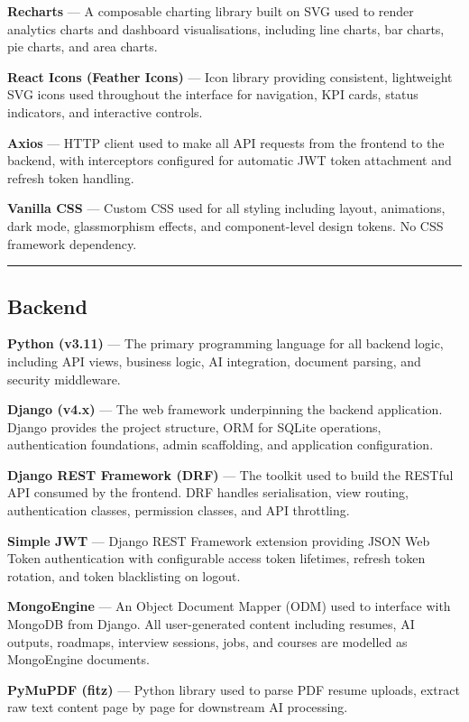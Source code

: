 \documentclass[12pt]{article}
\begin{document}
\textbf{Recharts} --- A composable charting library built on SVG used to render analytics charts and dashboard visualisations, including line charts, bar charts, pie charts, and area charts.

\textbf{React Icons (Feather Icons)} --- Icon library providing consistent, lightweight SVG icons used throughout the interface for navigation, KPI cards, status indicators, and interactive controls.

\textbf{Axios} --- HTTP client used to make all API requests from the frontend to the backend, with interceptors configured for automatic JWT token attachment and refresh token handling.

\textbf{Vanilla CSS} --- Custom CSS used for all styling including layout, animations, dark mode, glassmorphism effects, and component-level design tokens. No CSS framework dependency.

\noindent\rule{\textwidth}{0.4pt}

\subsection{Backend}

\textbf{Python (v3.11)} --- The primary programming language for all backend logic, including API views, business logic, AI integration, document parsing, and security middleware.

\textbf{Django (v4.x)} --- The web framework underpinning the backend application. Django provides the project structure, ORM for SQLite operations, authentication foundations, admin scaffolding, and application configuration.

\textbf{Django REST Framework (DRF)} --- The toolkit used to build the RESTful API consumed by the frontend. DRF handles serialisation, view routing, authentication classes, permission classes, and API throttling.

\textbf{Simple JWT} --- Django REST Framework extension providing JSON Web Token authentication with configurable access token lifetimes, refresh token rotation, and token blacklisting on logout.

\textbf{MongoEngine} --- An Object Document Mapper (ODM) used to interface with MongoDB from Django. All user-generated content including resumes, AI outputs, roadmaps, interview sessions, jobs, and courses are modelled as MongoEngine documents.

\textbf{PyMuPDF (fitz)} --- Python library used to parse PDF resume uploads, extract raw text content page by page for downstream AI processing.
\end{document}
